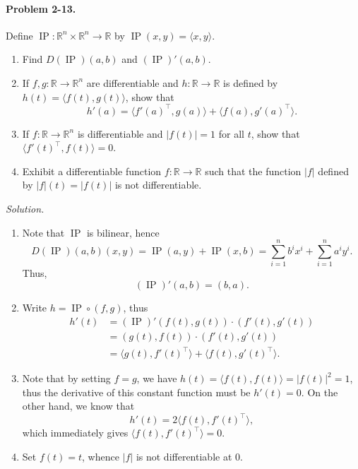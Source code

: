 \documentclass[11pt]{report}
\newcommand{\R}{\mathbb{R}}
\newcommand{\ip}[2]{\langle #1, #2 \rangle}
\newcommand{\problem}[1]{\paragraph{Problem #1.}}
\newcommand{\solution}{\noindent\textit{Solution.} }
\begin{document}
    \problem{2-13} Define $\operatorname{IP}\colon \R^n \times \R^n \to \R$ by
    $\operatorname{IP}(x, y) = \ip{x}{y}$.
    \begin{enumerate}
        \item Find $D(\operatorname{IP})(a, b)$ and $(\operatorname{IP})'(a, b)$.

        \item If $f, g\colon \R \to \R^n$ are differentiable and $h\colon \R \to \R$
        is defined by $h(t) = \ip{f(t)}{g(t)}$, show that \[
            h'(a) = \ip{f'(a)^\top}{g(a)} + \ip{f(a)}{g'(a)^\top}.
        \] 

        \item If $f\colon \R \to \R^n$ is differentiable and $|f(t)| = 1$ for all
        $t$, show that $\ip{f'(t)^\top}{f(t)} = 0$.

        \item Exhibit a differentiable function $f\colon \R \to \R$ such that the
        function $|f|$ defined by $|f|(t) = |f(t)|$ is not differentiable.
    \end{enumerate}

    \solution \begin{enumerate}
        \item Note that $\operatorname{IP}$ is bilinear, hence \[
            D(\operatorname{IP})(a, b)(x, y) = \operatorname{IP}(a, y) +
            \operatorname{IP}(x, b) = \sum_{i = 1}^n b^ix^i + \sum_{i = 1}^n a^iy^i.
        \] Thus, \[
            (\operatorname{IP})'(a, b) = (b, a).
        \] 

        \item Write $h = \operatorname{IP} \circ (f, g)$, thus \begin{align*}
            h'(t) &= (\operatorname{IP})'(f(t), g(t)) \cdot (f'(t), g'(t)) \\
            &= (g(t), f(t)) \cdot (f'(t), g'(t)) \\
            &= \ip{g(t)}{f'(t)^\top} + \ip{f(t)}{g'(t)^\top}.
        \end{align*}

        \item Note that by setting $f = g$, we have $h(t) = \ip{f(t)}{f(t)} =
        |f(t)|^2 = 1$, thus the derivative of this constant function must be $h'(t) =
        0$. On the other hand, we know that \[
            h'(t) = 2\ip{f(t)}{f'(t)^\top},
        \] which immediately gives $\ip{f(t)}{f'(t)^\top} = 0$.

        \item Set $f(t) = t$, whence $|f|$ is not differentiable at $0$.
    \end{enumerate}
\end{document}
